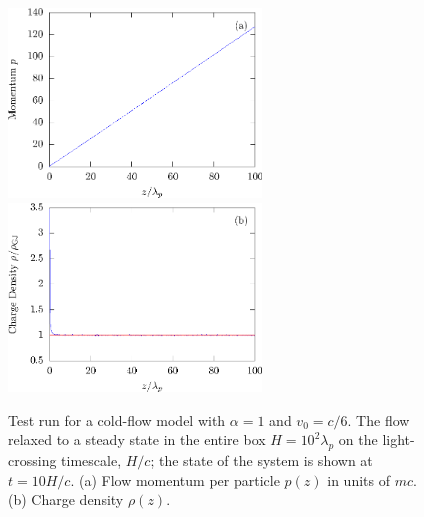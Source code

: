 \begin{figure}%
\begin{center}
  \includegraphics[width=0.6\textwidth]{pics/chap2/f2a.eps} \\
  \includegraphics[width=0.6\textwidth]{pics/chap2/f2b.eps}
\caption{Test run for a cold-flow model with $\alpha=1$ and $v_0=c/6$.
The flow relaxed to a steady state in the entire box $H=10^2\lambda_p$
on the light-crossing timescale, $H/c$; the state of the system is
shown at $t = 10H/c$.
(a) Flow momentum per particle $p(z)$ in units of $mc$.
(b) Charge density $\rho(z)$.}
\label{fig:alpha1}
\end{center}
\end{figure}

